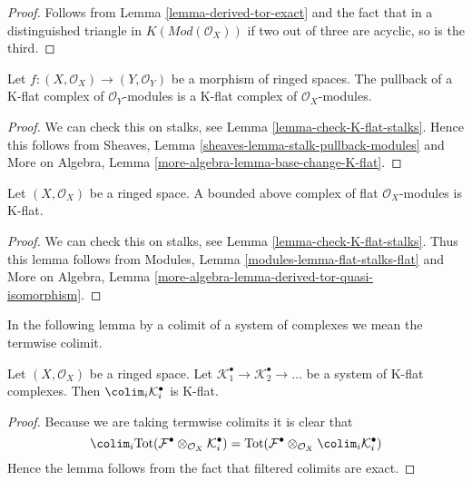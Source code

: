 \begin{proof}
Follows from
Lemma \ref{lemma-derived-tor-exact}
and the fact that in a distinguished triangle in
$K(\textit{Mod}(\mathcal{O}_X))$
if two out of three are acyclic, so is the third.
\end{proof}

\begin{lemma}
\label{lemma-pullback-K-flat}
Let $f : (X, \mathcal{O}_X) \to (Y, \mathcal{O}_Y)$ be a morphism of
ringed spaces. The pullback of a K-flat complex of $\mathcal{O}_Y$-modules
is a K-flat complex of $\mathcal{O}_X$-modules.
\end{lemma}

\begin{proof}
We can check this on stalks, see
Lemma \ref{lemma-check-K-flat-stalks}.
Hence this follows from
Sheaves, Lemma \ref{sheaves-lemma-stalk-pullback-modules}
and
More on Algebra, Lemma \ref{more-algebra-lemma-base-change-K-flat}.
\end{proof}

\begin{lemma}
\label{lemma-bounded-flat-K-flat}
Let $(X, \mathcal{O}_X)$ be a ringed space. A bounded above complex
of flat $\mathcal{O}_X$-modules is K-flat.
\end{lemma}

\begin{proof}
We can check this on stalks, see
Lemma \ref{lemma-check-K-flat-stalks}.
Thus this lemma follows from
Modules, Lemma \ref{modules-lemma-flat-stalks-flat}
and
More on Algebra, Lemma \ref{more-algebra-lemma-derived-tor-quasi-isomorphism}.
\end{proof}

\noindent
In the following lemma by a colimit of a system of complexes we mean
the termwise colimit.

\begin{lemma}
\label{lemma-colimit-K-flat}
Let $(X, \mathcal{O}_X)$ be a ringed space.
Let $\mathcal{K}_1^\bullet \to \mathcal{K}_2^\bullet \to \ldots$
be a system of K-flat complexes.
Then $\colim_i \mathcal{K}_i^\bullet$ is K-flat.
\end{lemma}

\begin{proof}
Because we are taking termwise colimits it is clear that
$$
\colim_i \text{Tot}(
\mathcal{F}^\bullet \otimes_{\mathcal{O}_X} \mathcal{K}_i^\bullet)
=
\text{Tot}(\mathcal{F}^\bullet \otimes_{\mathcal{O}_X}
\colim_i \mathcal{K}_i^\bullet)
$$
Hence the lemma follows from the fact that filtered colimits are
exact.
\end{proof}

